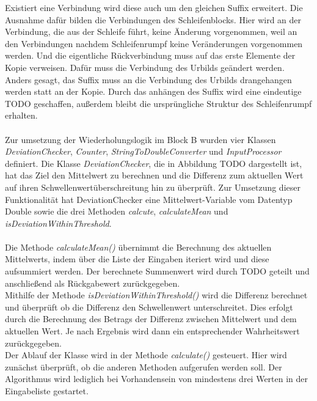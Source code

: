 \documentclass{article}
\begin{document}
    Existiert eine Verbindung wird diese auch um den gleichen Suffix erweitert.
    Die Ausnahme dafür bilden die Verbindungen des Schleifenblocks.
    Hier wird an der Verbindung, die aus der Schleife führt, keine Änderung vorgenommen, weil an den Verbindungen nachdem Schleifenrumpf keine Veränderungen vorgenommen werden.
    Und die eigentliche Rückverbindung muss auf das erste Elemente der Kopie verweisen. 
    Dafür muss die Verbindung des Urbilds geändert werden.
    Anders gesagt, das Suffix muss an die Verbindung des Urbilds drangehangen werden statt an der Kopie.
    Durch das anhängen des Suffix wird eine eindeutige TODO geschaffen, außerdem bleibt die ursprüngliche Struktur des Schleifenrumpf erhalten.\\
    \\ 
    Zur umsetzung der Wiederholungslogik im Block B wurden vier Klassen \textit{DeviationChecker}, \textit{Counter}, \textit{StringToDoubleConverter} und \textit{InputProcessor} definiert.
    Die Klasse \textit{DeviationChecker}, die in Abbildung TODO dargestellt ist, hat das Ziel den Mittelwert zu berechnen und die Differenz zum aktuellen Wert auf ihren Schwellenwertüberschreitung hin zu überprüft.
    Zur Umsetzung dieser Funktionalität hat DeviationChecker eine Mittelwert-Variable vom Datentyp Double sowie die drei Methoden \textit{calcute}, \textit{calculateMean} und \textit{isDeviationWithinThreshold}.\\
    \\
    Die Methode \textit{calculateMean()} übernimmt die Berechnung des aktuellen Mittelwerts, indem über die Liste der Eingaben iteriert wird und diese aufsummiert werden.
    Der berechnete Summenwert wird durch TODO geteilt und anschließend als Rückgabewert zurückgegeben.\\
    Mithilfe der Methode \textit{isDeviationWithinThreshold()} wird die Differenz berechnet und überprüft ob die Differenz den Schwellenwert unterschreitet.
    Dies erfolgt durch die Berechnung des Betrags der Differenz zwischen Mittelwert und dem aktuellen Wert.
    Je nach Ergebnis wird dann ein entsprechender Wahrheitswert zurückgegeben.\\
    Der Ablauf der Klasse wird in der Methode \textit{calculate()} gesteuert. Hier wird zunächst überprüft, ob die anderen Methoden aufgerufen werden soll.
    Der Algorithmus wird lediglich bei Vorhandensein von mindestens drei Werten in der Eingabeliste gestartet.
\end{document}
